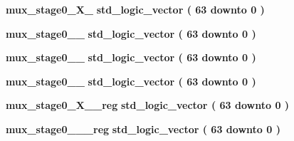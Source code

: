\begin{DoxyCompactItemize}
\item 
{\bf mux\+\_\+stage0\+\_\+\+X\+\_} {\bfseries \textcolor{comment}{std\+\_\+logic\+\_\+vector}\textcolor{vhdlchar}{ }\textcolor{vhdlchar}{(}\textcolor{vhdlchar}{ }\textcolor{vhdlchar}{ } \textcolor{vhdldigit}{63} \textcolor{vhdlchar}{ }\textcolor{keywordflow}{downto}\textcolor{vhdlchar}{ }\textcolor{vhdlchar}{ } \textcolor{vhdldigit}{0} \textcolor{vhdlchar}{ }\textcolor{vhdlchar}{)}\textcolor{vhdlchar}{ }} 
\item 
{\bf mux\+\_\+stage0\+\_\+\_} {\bfseries \textcolor{comment}{std\+\_\+logic\+\_\+vector}\textcolor{vhdlchar}{ }\textcolor{vhdlchar}{(}\textcolor{vhdlchar}{ }\textcolor{vhdlchar}{ } \textcolor{vhdldigit}{63} \textcolor{vhdlchar}{ }\textcolor{keywordflow}{downto}\textcolor{vhdlchar}{ }\textcolor{vhdlchar}{ } \textcolor{vhdldigit}{0} \textcolor{vhdlchar}{ }\textcolor{vhdlchar}{)}\textcolor{vhdlchar}{ }} 
\item 
{\bf mux\+\_\+stage0\+\_\+\_} {\bfseries \textcolor{comment}{std\+\_\+logic\+\_\+vector}\textcolor{vhdlchar}{ }\textcolor{vhdlchar}{(}\textcolor{vhdlchar}{ }\textcolor{vhdlchar}{ } \textcolor{vhdldigit}{63} \textcolor{vhdlchar}{ }\textcolor{keywordflow}{downto}\textcolor{vhdlchar}{ }\textcolor{vhdlchar}{ } \textcolor{vhdldigit}{0} \textcolor{vhdlchar}{ }\textcolor{vhdlchar}{)}\textcolor{vhdlchar}{ }} 
\item 
{\bf mux\+\_\+stage0\+\_\+\_} {\bfseries \textcolor{comment}{std\+\_\+logic\+\_\+vector}\textcolor{vhdlchar}{ }\textcolor{vhdlchar}{(}\textcolor{vhdlchar}{ }\textcolor{vhdlchar}{ } \textcolor{vhdldigit}{63} \textcolor{vhdlchar}{ }\textcolor{keywordflow}{downto}\textcolor{vhdlchar}{ }\textcolor{vhdlchar}{ } \textcolor{vhdldigit}{0} \textcolor{vhdlchar}{ }\textcolor{vhdlchar}{)}\textcolor{vhdlchar}{ }} 
\item 
{\bf mux\+\_\+stage0\+\_\+\+X\+\_\+\_\+reg} {\bfseries \textcolor{comment}{std\+\_\+logic\+\_\+vector}\textcolor{vhdlchar}{ }\textcolor{vhdlchar}{(}\textcolor{vhdlchar}{ }\textcolor{vhdlchar}{ } \textcolor{vhdldigit}{63} \textcolor{vhdlchar}{ }\textcolor{keywordflow}{downto}\textcolor{vhdlchar}{ }\textcolor{vhdlchar}{ } \textcolor{vhdldigit}{0} \textcolor{vhdlchar}{ }\textcolor{vhdlchar}{)}\textcolor{vhdlchar}{ }} 
\item 
{\bf mux\+\_\+stage0\+\_\+\_\+\_\+reg} {\bfseries \textcolor{comment}{std\+\_\+logic\+\_\+vector}\textcolor{vhdlchar}{ }\textcolor{vhdlchar}{(}\textcolor{vhdlchar}{ }\textcolor{vhdlchar}{ } \textcolor{vhdldigit}{63} \textcolor{vhdlchar}{ }\textcolor{keywordflow}{downto}\textcolor{vhdlchar}{ }\textcolor{vhdlchar}{ } \textcolor{vhdldigit}{0} \textcolor{vhdlchar}{ }\textcolor{vhdlchar}{)}\textcolor{vhdlchar}{ }} 

\end{DoxyCompactItemize}
